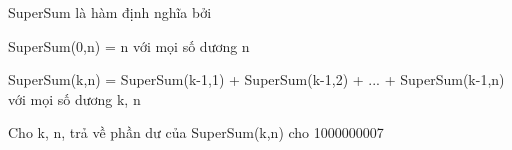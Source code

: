 SuperSum là hàm định nghĩa bởi  

   SuperSum(0,n) = n với mọi số dương n  

   SuperSum(k,n) = SuperSum(k-1,1) + SuperSum(k-1,2) + ... + SuperSum(k-1,n) với mọi số dương k, n  

   Cho k, n, trả về phần dư của SuperSum(k,n) cho 1000000007